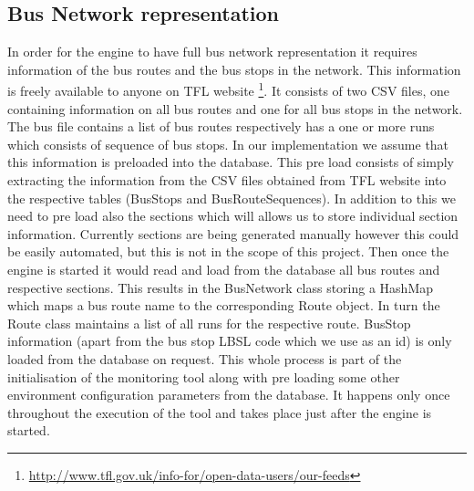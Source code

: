 \subsection{Bus Network representation}
In order for the engine to have full bus network representation it requires information of the bus routes and the bus stops in the network. This information is freely available to anyone on TFL website \footnote{\url{http://www.tfl.gov.uk/info-for/open-data-users/our-feeds}}. It consists of two CSV files, one containing information on all bus routes and one for all bus stops in the network. The bus file contains a list of bus routes respectively has a one or more runs which consists of sequence of bus stops. In our implementation we assume that this information is preloaded into the database. This pre load consists of simply extracting the information from the CSV files obtained from TFL website into the respective tables (BusStops and BusRouteSequences). In addition to this we need to pre load also the sections which will allows us to store individual section information. Currently sections are being generated manually however this could be easily automated, but this is not in the scope of this project. Then once the engine is started it would read and load from the database all bus routes and respective sections. This results in the BusNetwork class storing a HashMap which maps a bus route name to the corresponding Route object. In turn the Route class maintains a list of all runs for the respective route. BusStop information (apart from the bus stop LBSL code which we use as an id) is only loaded from the database on request. This whole process is part of the initialisation of the monitoring tool along with pre loading some other environment configuration parameters from the database. It happens only once throughout the execution of the tool and takes place just after the engine is started.


